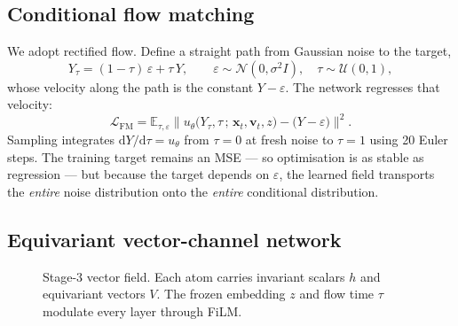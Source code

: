 \documentclass[11pt,a4paper]{article}
\begin{document}
\subsection{Conditional flow matching}
We adopt rectified flow. Define a straight path from Gaussian noise to the
target,
\[
Y_\tau = (1-\tau)\,\varepsilon + \tau\,Y,
\qquad \varepsilon\sim\mathcal{N}(0,\sigma^2 I),\quad \tau\sim\mathcal{U}(0,1),
\]
whose velocity along the path is the constant $Y-\varepsilon$. The network
regresses that velocity:
\[
\mathcal{L}_{\mathrm{FM}}
= \mathbb{E}_{\tau,\varepsilon}\Big\|
u_\theta\big(Y_\tau,\tau \,;\, \mathbf{x}_t,\mathbf{v}_t,z\big)
- \big(Y-\varepsilon\big)\Big\|^2 .
\]
Sampling integrates $\mathrm{d}Y/\mathrm{d}\tau = u_\theta$ from $\tau{=}0$ at
fresh noise to $\tau{=}1$ using 20 Euler steps. The training target remains an
MSE --- so optimisation is as stable as regression --- but because the target
depends on $\varepsilon$, the learned field transports the \emph{entire} noise
distribution onto the \emph{entire} conditional distribution.

\subsection{Equivariant vector-channel network}

\begin{figure}[H]
\centering
{}
\caption{Stage-3 vector field. Each atom carries invariant scalars $h$ and
equivariant vectors $V$. The frozen embedding $z$ and flow time $\tau$ modulate
every layer through FiLM.}
\label{fig:stage3}
\end{figure}
\end{document}
